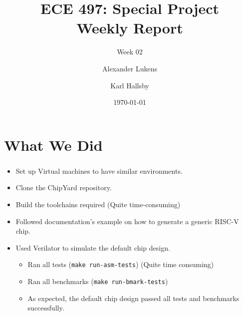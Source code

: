 \documentclass{../weeklyslides}
\title[Weekly Report]{ECE 497: Special Project \\ Weekly Report}
\subtitle{Week 02}
\author{Alexander Lukens \and Karl Hallsby}
\institute{Illinois Institute of Technology}
\date{\today}
\begin{document}
\nocite{chipyard}

\begin{frame}
  \titlepage{}
\end{frame}

\section{What We Did}\label{sec:What_We_Did}
\begin{frame}
  \frametitle{}
  \begin{itemize}
  \item Set up Virtual machines to have similar environments.
  \item Clone the ChipYard repository.
  \item Build the toolchains required (Quite time-consuming)
  \item Followed documentation's example on how to generate a generic RISC-V chip.
  \item Used Verilator to simulate the default chip design.
    \begin{itemize}
    \item Ran all tests (\texttt{make run-asm-tests}) (Quite time consuming)
    \item Ran all benchmarks (\texttt{make run-bmark-tests})
    \item As expected, the default chip design passed all tests and benchmarks successfully.
    \end{itemize}
  \end{itemize}
\end{frame}
\end{document}
